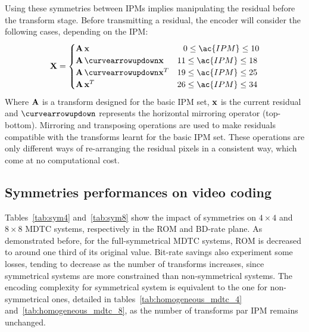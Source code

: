 \documentclass[11pt,a4paper,openright,twoside]{book}
\numberwithin{equation}{section} %
\numberwithin{figure}{section} %
\numberwithin{table}{section} %
\begin{document}
Using these symmetries between \acp{IPM} implies manipulating the residual
before the transform stage.
Before transmitting a residual, the encoder will consider the following cases,
depending on the \ac{IPM}:
\begin{equation}
	\X =
	\begin{cases}
		\A \, \x & \;\;\, 0 \le \ac{IPM} \le 10 \\
		\A \, \curvearrowupdown\x & 11 \le \ac{IPM} \le 18 \\
		\A \, \curvearrowupdown\x^T & 19 \le \ac{IPM} \le 25 \\
		\A \, \x^T & 26 \le \ac{IPM} \le 34 \\
	\end{cases}
\end{equation}
Where $\mathbf{A}$ is a transform designed for the basic IPM set, $\mathbf{x}$ is the current
residual and $\curvearrowupdown$ represents the horizontal mirroring operator
(top-bottom).
Mirroring and transposing operations are used to make residuals compatible
with the transforms learnt for the basic IPM set.
These operations are only different ways of re-arranging the residual pixels
in a consistent way, which come at no computational cost.

\subsection{Symmetries performances on video coding}
\label{sub:symmetries_performances_on_video_coding}

Tables~\ref{tab:sym4} and~\ref{tab:sym8} show the impact of symmetries on
$4\times4$ and $8\times8$ \ac{MDTC} systems, respectively in the \acs{ROM} and
\ac{BD}-rate plane.
As demonstrated before, for the full-symmetrical \ac{MDTC} systems, \acs{ROM}
is decreased to around one third of its original value.
Bit-rate savings also experiment some losses, tending to decrease as the
number of transforms increases, since symmetrical systems are more constrained
than non-symmetrical systems.
The encoding complexity for symmetrical system is equivalent to the one for
non-symmetrical ones, detailed in tables~\ref{tab:homogeneous_mdtc_4}
and~\ref{tab:homogeneous_mdtc_8}, as the number of transforms par \ac{IPM}
remains unchanged.
\end{document}
